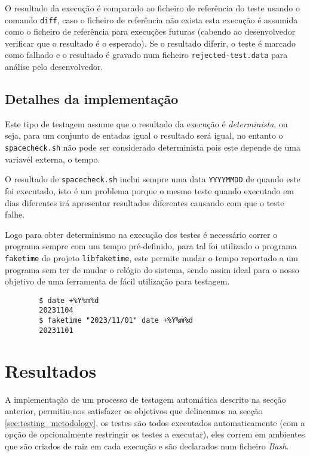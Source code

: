O resultado da execução é comparado ao ficheiro de referência do teste usando o
comando \Verb|diff|, caso o ficheiro de referência não exista esta execução é
assumida como o ficheiro de referência para execuções futuras (cabendo ao
desenvolvedor verificar que o resultado é o esperado). Se o resultado diferir,
o teste é marcado como falhado e o resultado é gravado num ficheiro
\Verb|rejected-test.data| para análise pelo desenvolvedor.

\subsection{Detalhes da implementação}

Este tipo de testagem assume que o resultado da execução é \emph{determinista},
ou seja, para um conjunto de entadas igual o resultado será igual, no entanto
o \Verb|spacecheck.sh| não pode ser considerado determinista pois este depende
de uma variavél externa, o tempo.

O resultado de \Verb|spacecheck.sh| inclui sempre uma data \Verb|YYYYMMDD| de
quando este foi executado, isto é um problema porque o mesmo teste quando
executado em dias diferentes irá apresentar resultados diferentes causando com
que o teste falhe.

Logo para obter determinismo na execução dos testes é necessário correr o
programa sempre com um tempo pré-definido, para tal foi utilizado o programa
\Verb|faketime| do projeto \Verb|libfaketime|, este permite mudar o tempo
reportado a um programa sem ter de mudar o relógio do sistema, sendo assim ideal
para o nosso objetivo de uma ferramenta de fácil utilização para testagem.

\begin{listing}[H]
	\begin{verbatim}
		$ date +%Y%m%d
		20231104
		$ faketime "2023/11/01" date +%Y%m%d
		20231101
	\end{verbatim}
	\cprotect\caption{Exemplo do funcionamento de \Verb|faketime|.}
\end{listing}

\section{Resultados}

A implementação de um processo de testagem automática descrito na secção
anterior, permitiu-nos satisfazer os objetivos que delineamos na secção
\ref{sec:testing_metodology}, os testes são todos executados automaticamente (com a
opção de opcionalmente restringir os testes a executar), eles correm em
ambientes que são criados de raiz em cada execução e são declarados num ficheiro
\emph{Bash}.


